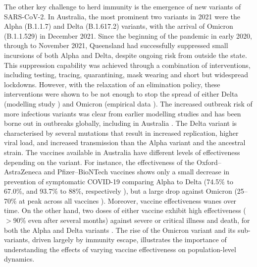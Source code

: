 \documentclass[article, a4, authoryear]{elsarticle}
\begin{document}
The other key challenge to herd immunity is the emergence of new variants of SARS-CoV-2. In Australia, the most prominent two variants in 2021 were the Alpha (B.1.1.7) and Delta (B.1.617.2) variants, with the arrival of Omicron (B.1.1.529) in December 2021. Since the beginning of the pandemic in early 2020, through to November 2021, Queensland had successfully suppressed small incursions of both Alpha and Delta, despite ongoing risk from outside the state. This suppression capability was achieved through a combination of interventions, including testing, tracing, quarantining, mask wearing and short but widespread lockdowns. However, with the relaxation of an elimination policy, these interventions were shown to be not enough to stop the spread of either Delta (modelling study \cite{qimr-borders-delta}) and Omicron (empirical data \cite{qld-omicron-peak-1, qld-omicron-peak-2}).  
The increased outbreak risk of more infectious variants was clear from earlier modelling studies \cite{ramos2021modeling, cohen2021mechanistic, giordano2021modeling,sanz-leon2021qldmodel, panovska2022statistical, althaus2021tale, dyson2021possible, milne2022wa} and has been borne out in outbreaks globally, including in Australia \cite{scott2020modelling, stuart2020nswmasks, abeysuriya2020preventing, abeysuriyaprojected, McBryde_2021, zachreson2021will, doherty2021, milne2022wa}. The Delta variant is characterised by several mutations that result in increased replication, higher viral load, and increased transmission \cite{bernal_delta_2021} than the Alpha variant and the ancestral strain. The vaccines available in Australia have different levels of effectiveness depending on the variant. For instance, the effectiveness of the Oxford--AstraZeneca and Pfizer--BioNTech vaccines shows only a small decrease in prevention of symptomatic COVID-19 comparing Alpha to Delta (74.5\% to 67.0\%, and 93.7\% to 88\%, respectively \cite{bernal_delta_2021}), but a large drop against Omicron (25--70\% at peak across all vaccines \cite{ukhsa-vaccine-omicron}). Moreover, vaccine effectiveness wanes over time\cite{ukhsa-vaccine-waning, chemaitelly-qatar-waning}. On the other hand, two doses of either vaccine exhibit high effectiveness ($>$90\% even after several months) against severe or critical illness and death, for both the Alpha and Delta variants \cite{ukhsa-vaccine-omicron, chemaitelly-qatar-waning}. The rise of the Omicron variant and its sub-variants, driven largely by immunity escape, illustrates the importance of understanding the effects of varying vaccine effectiveness on population-level dynamics.
\end{document}
